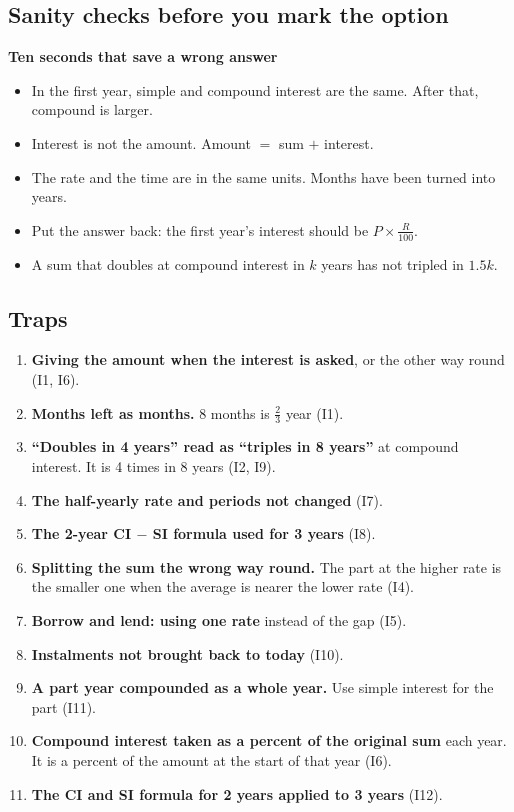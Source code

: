 \documentclass[11pt,a4paper]{article}
\let\oldsubsection\subsection
\renewcommand{\subsection}{\needspace{9\baselineskip}\oldsubsection}
\newcommand{\infobox}[2]{\par\medskip\noindent\begingroup\setlength{\fboxsep}{7pt}%
  \colorbox{codebg}{\parbox{\dimexpr\linewidth-14pt\relax}{\textbf{\color{ember}#1}\par\smallskip #2}}\endgroup\par\medskip}
\begin{document}
\subsection*{Sanity checks before you mark the option}
\infobox{Ten seconds that save a wrong answer}{
\begin{itemize}
\item In the first year, simple and compound interest are the same. After that, compound is larger.
\item Interest is not the amount. Amount $=$ sum $+$ interest.
\item The rate and the time are in the same units. Months have been turned into years.
\item Put the answer back: the first year's interest should be $P\times\tfrac{R}{100}$.
\item A sum that doubles at compound interest in $k$ years has not tripled in $1.5k$.
\end{itemize}}

\subsection*{Traps}
\begin{enumerate}
\item \textbf{Giving the amount when the interest is asked}, or the other way round (I1, I6).
\item \textbf{Months left as months.} 8 months is $\tfrac23$ year (I1).
\item \textbf{``Doubles in 4 years'' read as ``triples in 8 years''} at compound interest. It is 4 times in 8 years (I2, I9).
\item \textbf{The half-yearly rate and periods not changed} (I7).
\item \textbf{The 2-year CI $-$ SI formula used for 3 years} (I8).
\item \textbf{Splitting the sum the wrong way round.} The part at the higher rate is the smaller one when the average is nearer the lower rate (I4).
\item \textbf{Borrow and lend: using one rate} instead of the gap (I5).
\item \textbf{Instalments not brought back to today} (I10).
\item \textbf{A part year compounded as a whole year.} Use simple interest for the part (I11).
\item \textbf{Compound interest taken as a percent of the original sum} each year. It is a percent of the amount at the start of that year (I6).
\item \textbf{The CI and SI formula for 2 years applied to 3 years} (I12).
\end{enumerate}
\end{document}
